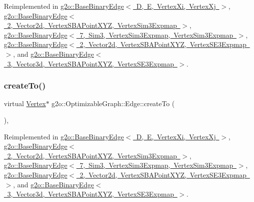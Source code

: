 Reimplemented in \mbox{\hyperlink{classg2o_1_1_base_binary_edge_a32bfc93b6dede619c7d99db2fb60f80d}{g2o\+::\+Base\+Binary\+Edge$<$ D, E, Vertex\+Xi, Vertex\+Xj $>$}}, \mbox{\hyperlink{classg2o_1_1_base_binary_edge_a32bfc93b6dede619c7d99db2fb60f80d}{g2o\+::\+Base\+Binary\+Edge$<$ 2, Vector2d, Vertex\+S\+B\+A\+Point\+X\+Y\+Z, Vertex\+Sim3\+Expmap $>$}}, \mbox{\hyperlink{classg2o_1_1_base_binary_edge_a32bfc93b6dede619c7d99db2fb60f80d}{g2o\+::\+Base\+Binary\+Edge$<$ 7, Sim3, Vertex\+Sim3\+Expmap, Vertex\+Sim3\+Expmap $>$}}, \mbox{\hyperlink{classg2o_1_1_base_binary_edge_a32bfc93b6dede619c7d99db2fb60f80d}{g2o\+::\+Base\+Binary\+Edge$<$ 2, Vector2d, Vertex\+S\+B\+A\+Point\+X\+Y\+Z, Vertex\+S\+E3\+Expmap $>$}}, and \mbox{\hyperlink{classg2o_1_1_base_binary_edge_a32bfc93b6dede619c7d99db2fb60f80d}{g2o\+::\+Base\+Binary\+Edge$<$ 3, Vector3d, Vertex\+S\+B\+A\+Point\+X\+Y\+Z, Vertex\+S\+E3\+Expmap $>$}}.

\mbox{\label{classg2o_1_1_optimizable_graph_1_1_edge_a39c22b396ab312059ea8fa4c2776be2e}} 
\subsubsection{\texorpdfstring{create\+To()}{createTo()}}
{\footnotesize\ttfamily virtual \mbox{\hyperlink{classg2o_1_1_optimizable_graph_1_1_vertex}{Vertex}}$\ast$ g2o\+::\+Optimizable\+Graph\+::\+Edge\+::create\+To (\begin{DoxyParamCaption}{ }\end{DoxyParamCaption})\hspace{0.3cm}{\ttfamily [inline]}, {\ttfamily [virtual]}}



Reimplemented in \mbox{\hyperlink{classg2o_1_1_base_binary_edge_ac7cce17e3229445e5a33c3cb8a569320}{g2o\+::\+Base\+Binary\+Edge$<$ D, E, Vertex\+Xi, Vertex\+Xj $>$}}, \mbox{\hyperlink{classg2o_1_1_base_binary_edge_ac7cce17e3229445e5a33c3cb8a569320}{g2o\+::\+Base\+Binary\+Edge$<$ 2, Vector2d, Vertex\+S\+B\+A\+Point\+X\+Y\+Z, Vertex\+Sim3\+Expmap $>$}}, \mbox{\hyperlink{classg2o_1_1_base_binary_edge_ac7cce17e3229445e5a33c3cb8a569320}{g2o\+::\+Base\+Binary\+Edge$<$ 7, Sim3, Vertex\+Sim3\+Expmap, Vertex\+Sim3\+Expmap $>$}}, \mbox{\hyperlink{classg2o_1_1_base_binary_edge_ac7cce17e3229445e5a33c3cb8a569320}{g2o\+::\+Base\+Binary\+Edge$<$ 2, Vector2d, Vertex\+S\+B\+A\+Point\+X\+Y\+Z, Vertex\+S\+E3\+Expmap $>$}}, and \mbox{\hyperlink{classg2o_1_1_base_binary_edge_ac7cce17e3229445e5a33c3cb8a569320}{g2o\+::\+Base\+Binary\+Edge$<$ 3, Vector3d, Vertex\+S\+B\+A\+Point\+X\+Y\+Z, Vertex\+S\+E3\+Expmap $>$}}.

